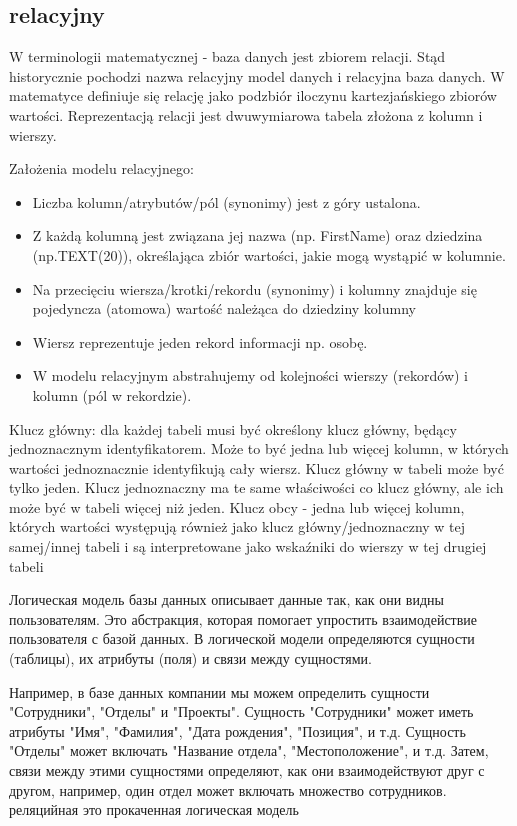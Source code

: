 \subsection*{relacyjny}
W terminologii matematycznej - baza danych jest zbiorem relacji.
Stąd historycznie pochodzi nazwa relacyjny model danych i relacyjna baza danych. W
matematyce definiuje się relację jako podzbiór iloczynu kartezjańskiego zbiorów wartości.
Reprezentacją relacji jest dwuwymiarowa tabela złożona z kolumn i wierszy.

Założenia modelu relacyjnego:

\begin{itemize}
\item Liczba kolumn/atrybutów/pól (synonimy) jest z góry ustalona.
\item Z każdą kolumną jest związana jej nazwa (np. FirstName) oraz dziedzina (np.TEXT(20)), określająca zbiór wartości, jakie mogą wystąpić w kolumnie.
\item Na przecięciu wiersza/krotki/rekordu (synonimy) i kolumny znajduje się pojedyncza (atomowa) wartość należąca do dziedziny kolumny
\item  Wiersz reprezentuje jeden rekord informacji np. osobę.
\item W modelu relacyjnym abstrahujemy od kolejności wierszy (rekordów) i kolumn (pól w rekordzie).
\end{itemize}

Klucz główny: dla każdej tabeli musi być określony klucz główny, będący jednoznacznym identyfikatorem. Może to być jedna lub więcej kolumn, w których wartości jednoznacznie identyfikują cały wiersz. Klucz główny w tabeli może być tylko jeden.
Klucz jednoznaczny ma te same właściwości co klucz główny, ale ich może być w tabeli
więcej niż jeden.
Klucz obcy - jedna lub więcej kolumn, których wartości występują również jako klucz
główny/jednoznaczny w tej samej/innej tabeli i są interpretowane jako wskaźniki do wierszy w tej drugiej tabeli


Логическая модель базы данных описывает данные так, как они видны пользователям. 
Это абстракция, которая помогает упростить взаимодействие пользователя с базой данных. 
В логической модели определяются сущности (таблицы), их атрибуты (поля) и связи между сущностями.

Например, в базе данных компании мы можем определить сущности "Сотрудники", 
"Отделы" и "Проекты". Сущность "Сотрудники" может иметь атрибуты "Имя", "Фамилия", 
"Дата рождения", "Позиция", и т.д. Сущность "Отделы" может включать "Название отдела", 
"Местоположение", и т.д. Затем, связи между этими сущностями определяют, 
как они взаимодействуют друг с другом, например, один отдел может включать множество сотрудников.
реляцийная это прокаченная логическая модель

